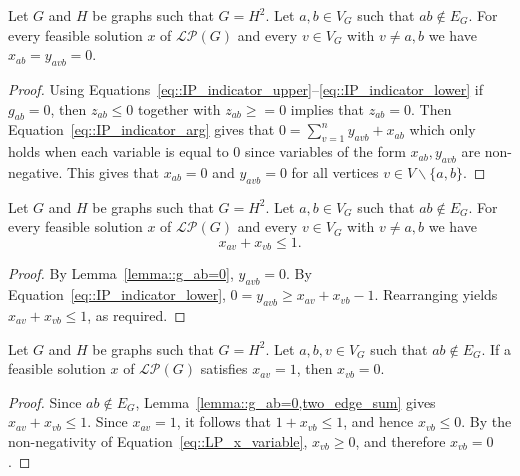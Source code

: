 
\begin{lemma} \label{lemma::g_ab=0}
  Let $G$ and $H$ be graphs such that $G = H^2$. Let $a,b \in V_G$ such that $ab \notin E_G$. For every feasible solution $x$ of $\mathcal{LP}(G)$ and every $v \in V_G$ with $v \neq a,b$ we have $x_{ab} = y_{avb} = 0$. 
\end{lemma}
\begin{proof}
  Using Equations~\eqref{eq::IP_indicator_upper}--\eqref{eq::IP_indicator_lower} if $g_{ab} = 0$, then $z_{ab} \leq 0$ together with $z_{ab} \geq = 0$ implies that $z_{ab} = 0$. Then Equation~\eqref{eq::IP_indicator_arg} gives that $\displaystyle 0 = \sum_{v = 1}^{n} y_{avb} + x_{ab}$ which only holds when each variable is equal to $0$ since variables of the form $x_{ab}, y_{avb}$ are non-negative. This gives that $x_{ab} = 0$ and $y_{avb} = 0$ for all vertices $v \in V \backslash \{a,b\}$. 
\end{proof}

\begin{lemma} \label{lemma::g_ab=0,two_edge_sum}
  Let $G$ and $H$ be graphs such that $G = H^2$. Let $a,b \in V_G$ such that $ab \notin E_G$. For every feasible solution $x$ of $\mathcal{LP}(G)$ and every $v \in V_G$ with $v \neq a,b$ we have
  \[
  x_{av} + x_{vb} \leq 1.
  \]
\end{lemma}
\begin{proof}
  By Lemma~\eqref{lemma::g_ab=0}, $y_{avb}=0$. By Equation~\eqref{eq::IP_indicator_lower}, $0 = y_{avb} \geq x_{av} + x_{vb} - 1$. Rearranging yields $x_{av} + x_{vb} \leq 1$, as required. 
\end{proof}

\begin{lemma} \label{lemma::g_ab=0,x_av=1}
  Let $G$ and $H$ be graphs such that $G = H^2$. Let $a,b,v \in V_G$ such that $ab \notin E_G$. If a feasible solution $x$ of $\mathcal{LP}(G)$ satisfies $x_{av}=1$, then $x_{vb}=0$.
\end{lemma}
\begin{proof}
  Since $ab \notin E_G$, Lemma~\eqref{lemma::g_ab=0,two_edge_sum} gives $x_{av}+x_{vb} \leq 1$. Since $x_{av}=1$, it follows that $1+x_{vb} \leq 1$, and hence $x_{vb} \leq 0$. By the non-negativity of Equation~\eqref{eq::LP_x_variable}, $x_{vb} \geq 0$, and therefore $x_{vb}=0$.
\end{proof}

